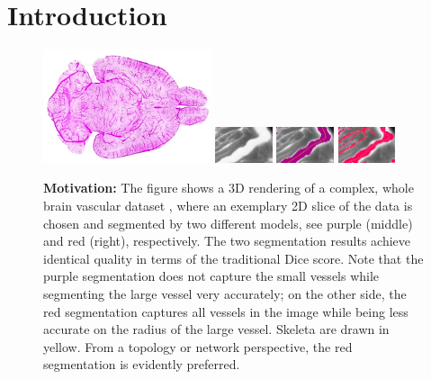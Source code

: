 \section{Introduction}
\begin{figure}[ht!]
\label{figmot}
\begin{center}
\includegraphics[width=0.44\textwidth]{figs/suppl/3d_vessels.png}
\includegraphics[width=0.15\textwidth]{figs/real.png}
\includegraphics[width=0.15\textwidth]{figs/clDice_fig1_thick.pdf}
\includegraphics[width=0.15\textwidth]{figs/clDice_fig1_thin.pdf}
\end{center}
\caption{\textbf{Motivation:} The figure shows a 3D rendering of a complex, whole brain vascular dataset \cite{todorov2019automated}, where an exemplary 2D slice of the data is chosen and segmented by two different models, see purple (middle) and red (right), respectively. The two segmentation results achieve identical quality in terms of the traditional Dice score. Note that the purple segmentation does not capture the small vessels while segmenting the large vessel very accurately; on the other side, the red segmentation captures all vessels in the image while being less accurate on the radius of the large vessel. Skeleta are drawn in yellow. From a topology or network perspective, the red segmentation is evidently preferred.}
\vspace{-1.5em}
\end{figure}
